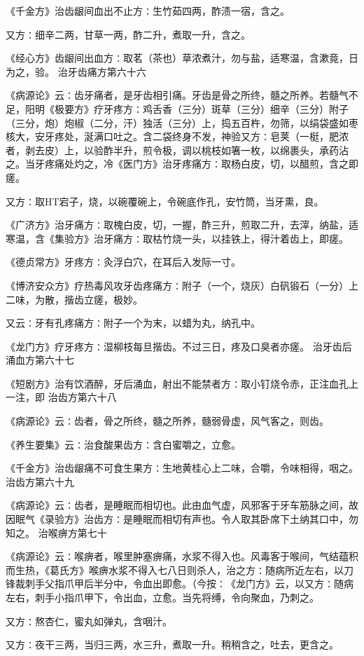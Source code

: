 \documentclass[a4paper,12pt,UTF8,twoside]{ctexbook}
\begin{document}
《千金方》治齿龈间血出不止方∶生竹茹四两，酢渍一宿，含之。

又方∶细辛二两，甘草一两，酢二升，煮取一升，含之。

《经心方》齿龈间出血方∶取茗（茶也）草浓煮汁，勿与盐，适寒温，含漱竟，日为之，验。
治牙齿痛方第六十六

《病源论》云∶齿牙痛者，是牙齿相引痛。牙齿是骨之所终，髓之所养。若髓气不足，阳明《极要方》疗牙疼方∶鸡舌香（三分）斑草（三分）细辛（三分）附子（三分，炮）炮椒（二分，汗）独活（三分）上，捣五百杵，勿筛，以绢袋盛如枣核大，安牙疼处，涎满口吐之。含二袋终身不发，神验又方∶皂荚（一梃，肥浓者，剥去皮）上，以验酢半升，煎令极，调以桃枝如箸一枚，以绵裹头，承药沾之。当牙疼痛处灼之，冷《医门方》治牙疼痛方∶取杨白皮，切，以醋煎，含之即瘥。

又方∶取HT宕子，烧，以碗覆碗上，令碗底作孔，安竹筒，当牙熏，良。

《广济方》治牙痛方∶取槐白皮，切，一握，酢三升，煎取二升，去滓，纳盐，适寒温，含《集验方》治牙痛方∶取枯竹烧一头，以挂铁上，得汁着齿上，即瘥。

《德贞常方》牙疼方∶灸浮白穴，在耳后入发际一寸。

《博济安众方》疗热毒风攻牙齿疼痛方∶附子（一个，烧灰）白矾锻石（一分）上二味，为散，揩齿立瘥，极妙。

又云∶牙有孔疼痛方∶附子一个为末，以蜡为丸，纳孔中。

《龙门方》疗牙疼方∶湿柳枝每旦揩齿。不过三日，疼及口臭者亦瘥。
治牙齿后涌血方第六十七

《短剧方》治有饮酒醉，牙后涌血，射出不能禁者方∶取小钉烧令赤，正注血孔上一注，即
治齿方第六十八

《病源论》云∶齿者，骨之所终，髓之所养，髓弱骨虚，风气客之，则齿。

《养生要集》云∶治食酸果齿方∶含白蜜嚼之，立愈。

《千金方》治齿龈痛不可食生果方∶生地黄桂心上二味，合嚼，令味相得，咽之。
治齿方第六十九

《病源论》云∶齿者，是睡眠而相切也。此由血气虚，风邪客于牙车筋脉之间，故因眠气《录验方》治齿方∶是睡眠而相切有声也。令人取其卧席下土纳其口中，勿知之。
治喉痹方第七十

《病源论》云∶喉痹者，喉里肿塞痹痛，水浆不得入也。风毒客于喉间，气结蕴积而生热，《葛氏方》喉痹水浆不得入七八日则杀人，治之方∶随病所近左右，以刀锋裁刺手父指爪甲后半分中，令血出即愈。（今按∶《龙门方》云，以又方∶随病左右，刺手小指爪甲下，令出血，立愈。当先将缚，令向聚血，乃刺之。

又方∶熬杏仁，蜜丸如弹丸，含咽汁。

又方∶夜干三两，当归三两，水三升，煮取一升。稍稍含之，吐去，更含之。
\end{document}
